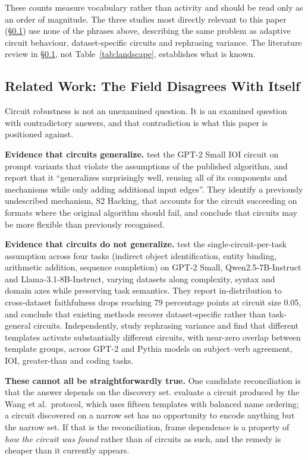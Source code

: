 \documentclass[11pt,a4paper]{article}
\begin{document}
These counts measure vocabulary rather than activity and should be read only as an
order of magnitude. The three studies most directly relevant to this paper
(\S\ref{sec:related}) use none of the phrases above, describing the same problem as
adaptive circuit behaviour, dataset-specific circuits and rephrasing variance. The
literature review in \S\ref{sec:related}, not Table~\ref{tab:landscape}, establishes
what is known.

\subsection{Related Work: The Field Disagrees With Itself}
\label{sec:related}

Circuit robustness is not an unexamined question. It is an examined question with
contradictory answers, and that contradiction is what this paper is positioned against.

\textbf{Evidence that circuits generalize.} \citet{merullo2024adaptive} test the GPT-2
Small IOI circuit on prompt variants that violate the assumptions of the published
algorithm, and report that it ``generalizes surprisingly well, reusing all of its
components and mechanisms while only adding additional input edges''. They identify a
previously undescribed mechanism, S2 Hacking, that accounts for the circuit succeeding
on formats where the original algorithm should fail, and conclude that circuits may be
more flexible than previously recognised.

\textbf{Evidence that circuits do not generalize.} \citet{rai2026dcd} test the
single-circuit-per-task assumption across four tasks (indirect object identification,
entity binding, arithmetic addition, sequence completion) on GPT-2 Small,
Qwen2.5-7B-Instruct and Llama-3.1-8B-Instruct, varying datasets along complexity,
syntax and domain axes while preserving task semantics. They report in-distribution to
cross-dataset faithfulness drops reaching 79 percentage points at circuit size 0.05,
and conclude that existing methods recover dataset-specific rather than task-general
circuits. Independently, \citet{anon2026variance} study rephrasing variance and find
that different templates activate substantially different circuits, with near-zero
overlap between template groups, across GPT-2 and Pythia models on subject--verb
agreement, IOI, greater-than and coding tasks.

\textbf{These cannot all be straightforwardly true.} One candidate reconciliation is
that the answer depends on the discovery set. \citet{merullo2024adaptive} evaluate a
circuit produced by the Wang et al.\ protocol, which uses fifteen templates with
balanced name ordering; a circuit discovered on a narrow set has no opportunity to
encode anything but the narrow set. If that is the reconciliation, frame dependence is
a property of \emph{how the circuit was found} rather than of circuits as such, and
the remedy is cheaper than it currently appears.
\end{document}
